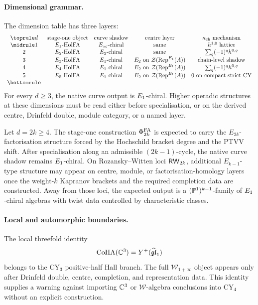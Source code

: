 \paragraph{Dimensional grammar.}
The dimension table has three layers:
\[
\begin{array}{ccccc}
\toprule
d & \text{stage-one object} & \text{curve shadow} & \text{centre layer} &
\kappa_{\mathrm{ch}}\text{ mechanism}\\
\midrule
1 & E_1\text{-HolFA} & E_\infty\text{-chiral} & \text{same} &
h^{1,0}\text{ lattice}\\
2 & E_2\text{-HolFA} & \Etwo\text{-chiral} & \text{same} &
\sum_q(-1)^q h^{0,q}\\
3 & E_3\text{-HolFA} & \Eone\text{-chiral} &
\Etwo\text{ on }\cZ(\RepE(A)) &
\text{chain-level shadow}\\
4 & E_4\text{-HolFA} & \Eone\text{-chiral} &
\Etwo\text{ on }\cZ(\RepE(A)) &
\sum_q(-1)^q h^{0,q}\\
5 & E_5\text{-HolFA} & \Eone\text{-chiral} &
\Etwo\text{ on }\cZ(\RepE(A)) &
0\text{ on compact strict CY}\\
\bottomrule
\end{array}
\]
For every \(d\geq3\), the native curve output is \(E_1\)-chiral. Higher
operadic structures at these dimensions must be read either before
specialisation, or on the derived centre, Drinfeld double, module category,
or a named layer.

\begin{conjecture}
\label{conj:cy4-higher-kapranov-clean}
Let \(d=2k\geq4\). The stage-one construction \(\Phi^{\mathrm{FA}}_{2k}\) is expected
to carry the \(E_{2k}\)-factorisation structure forced by the Hochschild
bracket degree and the PTVV shift. After specialisation along an admissible
\((2k-1)\)-cycle, the native curve shadow remains \(E_1\)-chiral. On
Rozansky--Witten loci \(\mathsf{RW}_{2k}\), additional \(E_{k-1}\)-type structure
may appear on centre, module, or factorisation-homology layers once the
weight-\(k\) Kapranov brackets and the required completion data are
constructed. Away from those loci, the expected output is a
\((\mathbb{P}^1)^{k-1}\)-family of \(E_1\)-chiral algebras with twist data
controlled by characteristic classes.
\end{conjecture}

\paragraph{Local and automorphic boundaries.}
The local threefold identity
\[
  \mathrm{CoHA}(\mathbb{C}^3)=Y^+(\widehat{\mathfrak{gl}}_1)
\]
belongs to the CY\(_3\) positive-half Hall branch. The full
\(\mathcal{W}_{1+\infty}\) object appears only after Drinfeld double,
centre, completion, and representation data. This identity supplies a
warning against importing \(\mathbb{C}^3\) or \(\mathcal{W}\)-algebra conclusions
into CY\(_4\) without an explicit construction.

